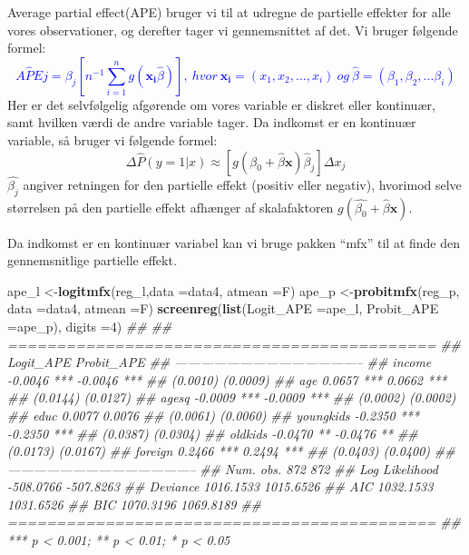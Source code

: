 \documentclass[
  10pt,
]{article}
\newenvironment{Shaded}{\begin{snugshade}}{\end{snugshade}}
\newcommand{\CommentTok}[1]{\textcolor[rgb]{0.56,0.35,0.01}{\textit{#1}}}
\newcommand{\DataTypeTok}[1]{\textcolor[rgb]{0.13,0.29,0.53}{#1}}
\newcommand{\DecValTok}[1]{\textcolor[rgb]{0.00,0.00,0.81}{#1}}
\newcommand{\KeywordTok}[1]{\textcolor[rgb]{0.13,0.29,0.53}{\textbf{#1}}}
\newcommand{\NormalTok}[1]{#1}
\begin{document}
Average partial effect(APE) bruger vi til at udregne de partielle
effekter for alle vores observationer, og derefter tager vi
gennemsnittet af det. Vi bruger følgende formel: \textcolor{blue}{
\[A\hat{P}Ej=\hat{\beta_j}\left[n^{-1}\sum\limits_{i=1}^ng(\mathbf{x_i}\hat{\beta})\right],\ hvor\ \mathbf{x_i}=(x_1,x_2,...,x_i)\ og\ \hat{\beta}=(\beta_1,\beta_2,...\beta_i) \] }
Her er det selvfølgelig afgørende om vores variable er diskret eller
kontinuær, samt hvilken værdi de andre variable tager. Da indkomst er en
kontinuær variable, så bruger vi følgende formel:
\[\Delta\hat{P}(y=1|x)\approx[g(\hat{\beta_0}+\hat{\beta}\mathbf{x})\hat{\beta}_j]\Delta x_j \]
\(\hat{\beta_j}\) angiver retningen for den partielle effekt (positiv
eller negativ), hvorimod selve størrelsen på den partielle effekt
afhænger af skalafaktoren \(g(\hat{\beta_0}+\hat{\beta}\mathbf{x})\). ~

Da indkomst er en kontinuær variabel kan vi bruge pakken ``mfx'' til at
finde den gennemsnitlige partielle effekt.

\begin{Shaded}
\begin{Highlighting}[]
\NormalTok{ape_l <-}\KeywordTok{logitmfx}\NormalTok{(reg_l,}\DataTypeTok{data =}\NormalTok{data4, }\DataTypeTok{atmean =}\NormalTok{F)}
\NormalTok{ape_p <-}\KeywordTok{probitmfx}\NormalTok{(reg_p, }\DataTypeTok{data =}\NormalTok{data4, }\DataTypeTok{atmean =}\NormalTok{F)}
\KeywordTok{screenreg}\NormalTok{(}\KeywordTok{list}\NormalTok{(}\DataTypeTok{Logit_APE =}\NormalTok{ape_l, }\DataTypeTok{Probit_APE =}\NormalTok{ape_p), }\DataTypeTok{digits =}\DecValTok{4}\NormalTok{)}
\CommentTok{## }
\CommentTok{## ============================================}
\CommentTok{##                 Logit_APE      Probit_APE   }
\CommentTok{## --------------------------------------------}
\CommentTok{## income            -0.0046 ***    -0.0046 ***}
\CommentTok{##                   (0.0010)       (0.0009)   }
\CommentTok{## age                0.0657 ***     0.0662 ***}
\CommentTok{##                   (0.0144)       (0.0127)   }
\CommentTok{## agesq             -0.0009 ***    -0.0009 ***}
\CommentTok{##                   (0.0002)       (0.0002)   }
\CommentTok{## educ               0.0077         0.0076    }
\CommentTok{##                   (0.0061)       (0.0060)   }
\CommentTok{## youngkids         -0.2350 ***    -0.2350 ***}
\CommentTok{##                   (0.0387)       (0.0304)   }
\CommentTok{## oldkids           -0.0470 **     -0.0476 ** }
\CommentTok{##                   (0.0173)       (0.0167)   }
\CommentTok{## foreign            0.2466 ***     0.2494 ***}
\CommentTok{##                   (0.0403)       (0.0400)   }
\CommentTok{## --------------------------------------------}
\CommentTok{## Num. obs.        872            872         }
\CommentTok{## Log Likelihood  -508.0766      -507.8263    }
\CommentTok{## Deviance        1016.1533      1015.6526    }
\CommentTok{## AIC             1032.1533      1031.6526    }
\CommentTok{## BIC             1070.3196      1069.8189    }
\CommentTok{## ============================================}
\CommentTok{## *** p < 0.001; ** p < 0.01; * p < 0.05}
\end{Highlighting}
\end{Shaded}
\end{document}
